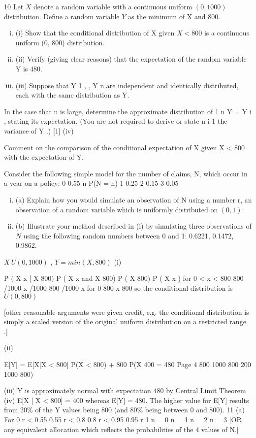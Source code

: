 \documentclass[a4paper,12pt]{article}
\begin{document}
10
Let $X$ denote a random variable with a continuous uniform $(0, 1000)$ distribution. Define a random variable $Y$ as the minimum of X and 800.

\begin{enumerate}[(i)]
\item (i) Show that the conditional distribution of X given $X < 800$ is a continuous uniform (0, 800) distribution.
\item (ii) Verify (giving clear reasons) that the expectation of the random variable Y is 480.
\item (iii) Suppose that Y 1 , , Y n are independent and identically distributed, each with the same distribution as Y.
\end{enumerate}
In the case that n is large, determine the approximate distribution of
1 n
Y =
Y i , stating its expectation. (You are not required to derive or state
n i 1
the variance of Y .)
[1]
(iv)

Comment on the comparison of the conditional expectation of X given X < 800 with the expectation of Y.

Consider the following simple model for the number of claims, N, which occur in a  year on a policy:
0
0.55
n
P(N = n)
1
0.25
2
0.15
3
0.05
\begin{enumerate}[(i)]
\item (a) Explain how you would simulate an observation of N using a number r, an observation of a random variable which is uniformly distributed on $(0, 1)$.
\item (b) Illustrate your method described in (i) by simulating three observations of $N$ using the following random numbers between 0 and 1: 0.6221, 0.1472, 0.9862.
\end{enumerate}

$X ~ U(0,1000)$ , $Y = min(X,800)$
(i)

P ( X
x | X
800)
P ( X
x and X 800)
P ( X 800)
P ( X x )
for 0 < x < 800
800 /1000
x /1000
800 /1000
x
for 0
800
x 800
so the conditional distribution is $U(0,800)$

[other reasonable arguments were given credit, e.g. the conditional distribution is simply a scaled version of the original uniform distribution on a restricted range .]


(ii)

E[Y] = E[X|X < 800] P(X < 800) + 800 P(X
400
= 480
Page 4
800
1000
800
200
1000
800)

(iii) Y is approximately normal with expectation 480 by Central Limit Theorem
(iv) E[X | X < 800] = 400 whereas E[Y] = 480.
The higher value for E[Y] results from 20\% of the Y values being 800 (and 80\% being between 0 and 800).
11
(a)
For 0 r < 0.55
0.55 r < 0.8
0.8 r < 0.95
0.95 r 1
n = 0
n = 1
n = 2
n = 3
[OR any equivalent allocation which reflects the probabilities of the 4 values
of N.]
\end{document}
